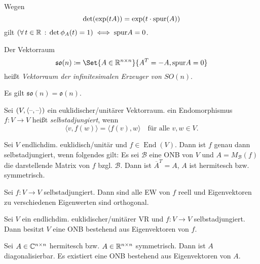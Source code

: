 \documentclass{cheat-sheet}
\DeclareMathOperator{\End}{End}
\newcommand{\BB}{\mathcal{B}}
\begin{document}
\begin{bem}
  Wegen
  \[ \det(\exp(tA)) = \exp(t \cdot \mathrm{spur}(A)) \]
  gilt $(\forall \, {t \in \mathbb{R}} \,:\, \det \phi_A(t) = 1) \iff \mathrm{spur} A = 0$.
\end{bem}

\begin{defn}
  Der Vektorraum
  \[ \mathfrak{so}(n) \coloneqq \Set{ A \in \R^{n \times n} }{ A^T = - A, \spur A = 0 } \]
  heißt \emph{Vektorraum der infinitesimalen Erzeuger von $SO(n)$}.
\end{defn}

\begin{satz}
  Es gilt $\mathfrak{so}(n) = \mathfrak{o}(n)$.
\end{satz}



\begin{defn}
  Sei $(V, \langle \text{--} , \text{--} \rangle)$ ein euklidischer/unitärer Vektorraum. ein Endomorphismus $f : V \to V$ heißt \emph{selbstadjungiert}, wenn
  \[ \langle v, f(w) \rangle = \langle f(v), w \rangle \quad \text{für alle $v, w \in V$.} \]
\end{defn}


\begin{satz}
  Sei $V$ endlichdim. euklidisch/unitär und $f \in \End(V)$. Dann ist $f$ genau dann selbstadjungiert, wenn folgendes gilt: Es sei $\BB$ eine ONB von $V$ und $A = M_\BB(f)$ die darstellende Matrix von $f$ bzgl. $\BB$. Dann ist $\overline{A}^T = A$, \dh{} $A$ ist hermitesch bzw. symmetrisch.
\end{satz}

\begin{satz}
  Sei $f : V \to V$ selbstadjungiert. Dann sind alle EW von $f$ reell und Eigenvektoren zu verschiedenen Eigenwerten sind orthogonal.
\end{satz}

\begin{satz}
  Sei $V$ ein endlichdim. euklidischer/unitärer VR und $f : V \to V$ selbstadjungiert. Dann besitzt $V$ eine ONB bestehend aus Eigenvektoren von $f$.
\end{satz}

\begin{kor}
  Sei $A \in \mathbb{C}^{n \times n}$ hermitesch bzw. $A \in \mathbb{R}^{n \times n}$ symmetrisch. Dann ist $A$ diagonalisierbar. Es existiert eine ONB bestehend aus Eigenvektoren von $A$.
\end{kor}
\end{document}
